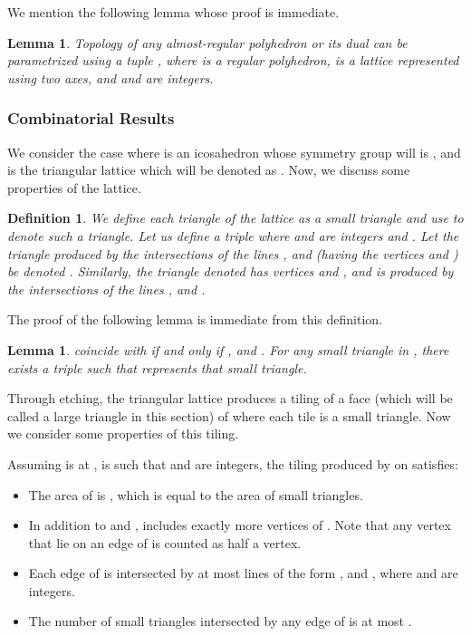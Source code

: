 \documentclass[11pt]{article}
\newtheorem{lemma}[thm]{Lemma}
\newtheorem{definition}[thm]{Definition}
\newcommand{\1}{\mathds{1}}
\begin{document}
We mention the following lemma whose proof is immediate.

\begin{lemma}
 Topology of any \emph{almost-regular} polyhedron or its dual can be parametrized using a tuple , where  is a regular polyhedron,  is a lattice represented using two axes, and  and  are integers.
\end{lemma}



\subsubsection{Combinatorial Results}
We consider the case where  is an icosahedron whose symmetry group will is , and  is the triangular lattice which will be denoted as . Now, we discuss some properties of the lattice.

\begin{definition}
We define each triangle of the lattice  as a small triangle and use  to denote such a triangle. Let us define a triple  where  and  are integers and . Let the triangle produced by the intersections of the lines ,  and  (having the vertices  and ) be denoted . Similarly, the triangle denoted  has vertices  and , and is produced by the intersections of the lines ,  and . 
\label{def:smallt}
\end{definition}

The proof of the following lemma is immediate from this definition.

\begin{lemma}
 coincide with  if and only if ,  and . For any small triangle in , there exists a triple  such that  represents that small triangle.
\end{lemma}

Through etching, the triangular lattice  produces a tiling of a face  (which will be called a large triangle in this section) of  where each tile is a small triangle. Now we consider some properties of this tiling.

Assuming  is at ,  is  such that  and  are integers, the tiling produced by  on  satisfies:
   \begin{itemize}
      \item The area of  is , which is equal to the area of  small triangles.
      \item In addition to  and ,  includes exactly  more vertices of . Note that any vertex that lie on an edge of  is counted as half a vertex.
      \item Each edge of  is intersected by at most  lines of the form ,  and , where  and  are integers.
      \item The number of small triangles intersected by any edge of  is at most .
   \end{itemize}
\end{document}
